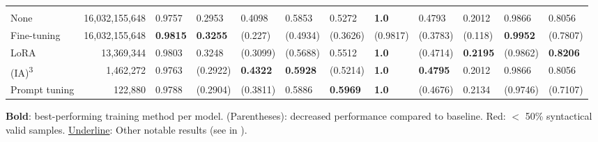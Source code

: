 \begin{table*}[htbp]
\begin{threeparttable}
\begin{tabularx}{\textwidth}{lrLLLLL!{\color{white}\ }LLLLL}
         \bigstrut \\*
        None & 16,032,155,648 & 0.9757 & 0.2953 & 0.4098 & 0.5853 & 0.5272 & \textbf{1.0} & 0.4793 & 0.2012 & 0.9866 & 0.8056 \\
        Fine-tuning & 16,032,155,648 & \textbf{0.9815} & \textbf{0.3255} & (0.227) & (0.4934) & (0.3626) & (0.9817) & (0.3783) & (0.118) & \textbf{0.9952} & (0.7807) \\
        LoRA & 13,369,344 & 0.9803 & 0.3248 & (0.3099) & (0.5688) & 0.5512 & \textbf{1.0} & (0.4714) & \textbf{0.2195} & (0.9862) & \textbf{0.8206} \\
        (IA)\textsuperscript{3} & 1,462,272 & 0.9763 & (0.2922) & \textbf{0.4322} & \textbf{0.5928} & (0.5214) & \textbf{1.0} & \textbf{0.4795} & 0.2012 & 0.9866 & 0.8056 \\
        Prompt tuning & 122,880 & 0.9788 & (0.2904) & (0.3811) & 0.5886 & \textbf{0.5969} & \textbf{1.0} & (0.4676) & 0.2134 & (0.9746) & (0.7107) \\

       \bottomrule
    \end{tabularx}
    \begin{tablenotes}[flushleft]\small
      \item \textbf{Bold}: best-performing training method per model. (Parentheses): decreased performance compared to baseline. \colorbox{red!10}{Red}: $<$ 50\% syntactical valid samples. \underline{Underline}: Other notable results (see in ).
    \end{tablenotes}
\end{threeparttable}
\end{table*}